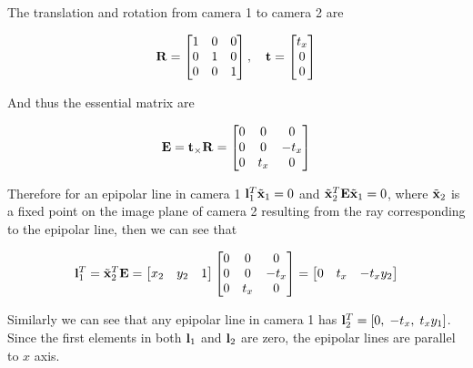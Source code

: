 \documentclass[11pt]{article}
\begin{document}

The translation and rotation from camera 1 to camera 2 are

\begin{align}
    \mathbf{R} =
    \begin{bmatrix}
        1 & 0 & 0 \\
        0 & 1 & 0 \\
        0 & 0 & 1
    \end{bmatrix}, \quad
    \mathbf{t} =
    \begin{bmatrix}
        t_x \\ 0 \\ 0
    \end{bmatrix}
\end{align}

And thus the essential matrix are

\begin{align}
  \mathbf{E}=\mathbf{t}_\times \mathbf{R}=
  \begin{bmatrix}
    0 & 0 & 0 \\
    0 & 0 & -t_x \\
    0 & t_x & 0
  \end{bmatrix}
\end{align}

Therefore for an epipolar line in camera 1 $\mathbf{l}_1^T \tilde{\mathbf{x}}_1=0$ and $\tilde{\mathbf{x}}_2^T \mathbf{E} \tilde{\mathbf{x}}_1 =0$, where $\tilde{\mathbf{x}}_2$ is a fixed point on the image plane of camera 2 resulting from the ray corresponding to the epipolar line, then we can see that

\begin{align}
  \mathbf{l}_1^T = \tilde{\mathbf{x}}_2^T \mathbf{E} =
  \begin{bmatrix}
    x_2 & y_2 & 1
  \end{bmatrix}
  \begin{bmatrix}
    0 & 0 & 0 \\
    0 & 0 & -t_x \\
    0 & t_x & 0
  \end{bmatrix}
  =
  \begin{bmatrix}
    0 & t_x & -t_x y_2
  \end{bmatrix}
\end{align}

Similarly we can see that any epipolar line in camera 1 has $\mathbf{l}_2^T = [0, \; -t_x, \; t_xy_1]$. Since the first elements in both $\mathbf{l}_1$ and $\mathbf{l}_2$ are zero, the epipolar lines are parallel to $x$ axis.
\end{document}

